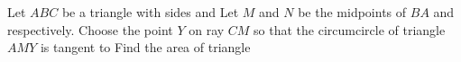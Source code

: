 Let $ABC$ be a triangle with sides   and  Let $M$ and $N$ be the midpoints of $BA$ and  respectively. Choose the point $Y$ on ray $CM$ so that the circumcircle of triangle $AMY$ is tangent to  Find the area of triangle 